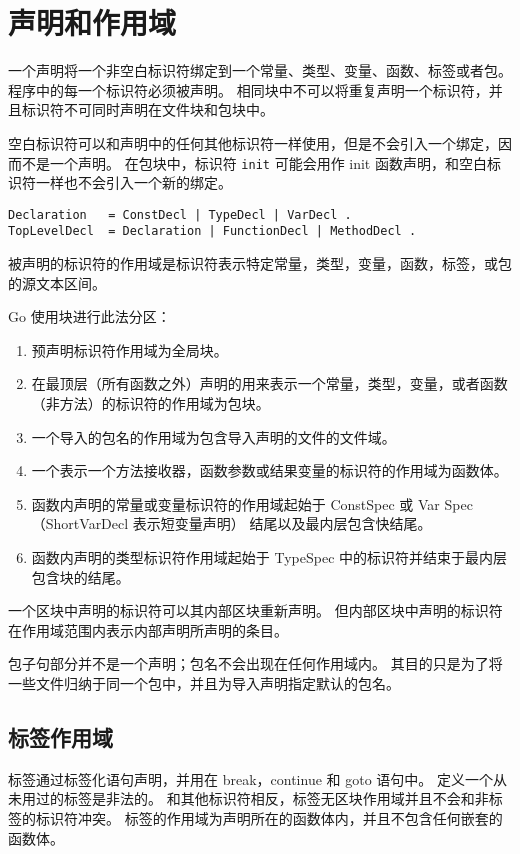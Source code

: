 \chapter{声明和作用域}
一个声明将一个非空白标识符绑定到一个常量、类型、变量、函数、标签或者包。
程序中的每一个标识符必须被声明。
相同块中不可以将重复声明一个标识符，并且标识符不可同时声明在文件块和包块中。

空白标识符可以和声明中的任何其他标识符一样使用，但是不会引入一个绑定，因而不是一个声明。
在包块中，标识符 \lstinline|init| 可能会用作 init 函数声明，和空白标识符一样也不会引入一个新的绑定。
\begin{lstlisting}[style=EBNF]
Declaration   = ConstDecl | TypeDecl | VarDecl .
TopLevelDecl  = Declaration | FunctionDecl | MethodDecl .
\end{lstlisting}
被声明的标识符的作用域是标识符表示特定常量，类型，变量，函数，标签，或包的源文本区间。

Go 使用块进行此法分区：
\begin{enumerate}[labelindent=\parindent,leftmargin=*]
\item 预声明标识符作用域为全局块。
\item 在最顶层（所有函数之外）声明的用来表示一个常量，类型，变量，或者函数（非方法）的标识符的作用域为包块。
\item 一个导入的包名的作用域为包含导入声明的文件的文件域。
\item 一个表示一个方法接收器，函数参数或结果变量的标识符的作用域为函数体。
\item 函数内声明的常量或变量标识符的作用域起始于 ConstSpec 或 Var Spec（ShortVarDecl 表示短变量声明） 结尾以及最内层包含快结尾。
\item 函数内声明的类型标识符作用域起始于 TypeSpec 中的标识符并结束于最内层包含块的结尾。
\end{enumerate}

一个区块中声明的标识符可以其内部区块重新声明。
但内部区块中声明的标识符在作用域范围内表示内部声明所声明的条目。

包子句部分并不是一个声明；包名不会出现在任何作用域内。
其目的只是为了将一些文件归纳于同一个包中，并且为导入声明指定默认的包名。

\section{标签作用域}
标签通过标签化语句声明，并用在 break，continue 和 goto 语句中。
定义一个从未用过的标签是非法的。
和其他标识符相反，标签无区块作用域并且不会和非标签的标识符冲突。
标签的作用域为声明所在的函数体内，并且不包含任何嵌套的函数体。

